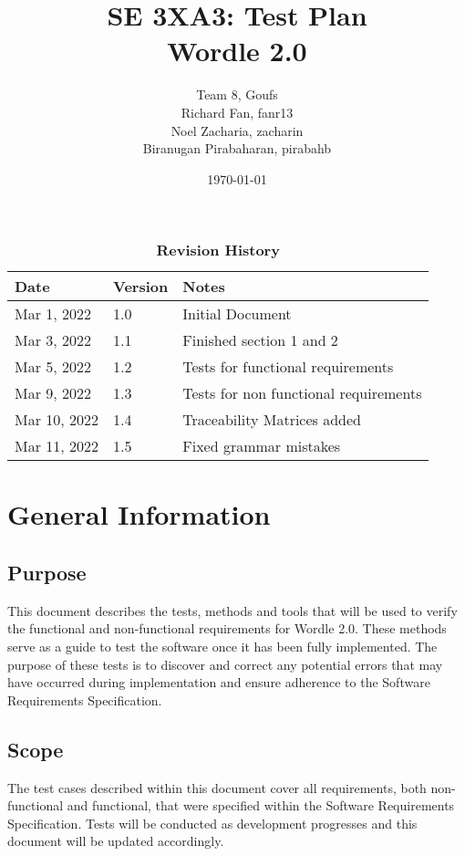 \documentclass[12pt, titlepage]{article}
\title{SE 3XA3: Test Plan\\Wordle 2.0}
\author{Team 8, Goufs
		\\ Richard Fan, fanr13
		\\ Noel Zacharia, zacharin
		\\ Biranugan Pirabaharan, pirabahb
}
\date{\today}
\begin{document}
\maketitle

\tableofcontents
\listoftables
\listoffigures

\begin{table}[bp]
\caption{\bf Revision History}
\begin{tabularx}{\textwidth}{p{3cm}p{2cm}X}
\toprule {\bf Date} & {\bf Version} & {\bf Notes}\\
\midrule
Mar 1, 2022 & 1.0 & Initial Document\\
Mar 3, 2022 & 1.1 & Finished section 1 and 2\\
Mar 5, 2022 & 1.2 & Tests for functional requirements\\
Mar 9, 2022 & 1.3 & Tests for non functional requirements\\
Mar 10, 2022 & 1.4 & Traceability Matrices added\\
Mar 11, 2022 & 1.5 & Fixed grammar mistakes\\
\bottomrule
\end{tabularx}
\end{table}

\newpage



\section{General Information}

\subsection{Purpose}
This document describes the tests, methods and tools that will be used to 
verify the functional and non-functional requirements for Wordle 2.0. These 
methods serve as a guide to test the software once it has been fully 
implemented. The purpose of these tests is to discover and correct any 
potential 
errors that may have occurred during implementation and ensure adherence to 
the Software Requirements Specification.

\subsection{Scope}
The test cases described within this document cover all requirements, both 
non-functional and functional, that were specified within the Software 
Requirements Specification. Tests will be conducted as development progresses 
and this document will be updated accordingly. 
\end{document}
